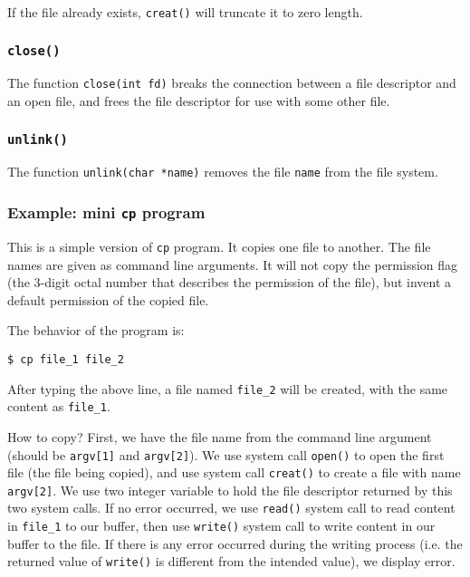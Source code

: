 \documentclass[11pt]{article}
\begin{document}
If the file already exists, \texttt{creat()} will truncate it to zero length.
\subsubsection{\texttt{close()}}
\label{sec:org4b5a5e7}
The function \texttt{close(int fd)} breaks the connection between a file descriptor and an open file, and frees the file descriptor for use with some other file.
\subsubsection{\texttt{unlink()}}
\label{sec:orgec6f270}
The function \texttt{unlink(char *name)} removes the file \texttt{name} from the file system.

\subsubsection{Example: mini \texttt{cp} program}
\label{sec:org0ac86ab}
This is a simple version of \texttt{cp} program. It copies one file to another. The file names are given as command line arguments. It will not copy the permission flag (the 3-digit octal number that describes the permission of the file), but invent a default permission of the copied file.

The behavior of the program is:
\begin{Verbatim}[frame=single]
$ cp file_1 file_2
\end{Verbatim}
After typing the above line, a file named \texttt{file\_2} will be created, with the same content as \texttt{file\_1}. 

How to copy? First, we have the file name from the command line argument (should be \texttt{argv[1]} and \texttt{argv[2]}). We use system call \texttt{open()} to open the first file (the file being copied), and use system call \texttt{creat()} to create a file with name \texttt{argv[2]}. We use two integer variable to hold the file descriptor returned by this two system calls. If no error occurred, we use \texttt{read()} system call to read content in \texttt{file\_1} to our buffer, then use \texttt{write()} system call to write content in our buffer to the file. If there is any error occurred during the writing process (i.e. the returned value of \texttt{write()} is different from the intended value), we display error.
\end{document}
